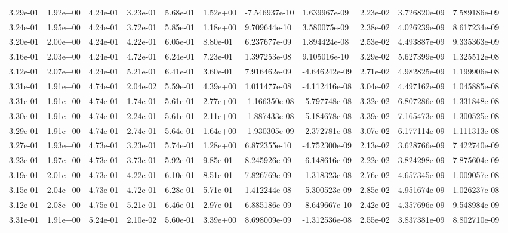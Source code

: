 \begin{longtable}{| p{} | p{} |}
3.29e-01 & 1.92e+00 & 4.24e-01 & 3.23e-01 & 5.68e-01 & 1.52e+00 & -7.546937e-10 &  1.639967e-09 &  2.23e-02 &  3.726820e-09 &  7.589186e-09 \\
3.24e-01 & 1.95e+00 & 4.24e-01 & 3.72e-01 & 5.85e-01 & 1.18e+00 &  9.709644e-10 &  3.580075e-09 &  2.38e-02 &  4.026239e-09 &  8.617234e-09 \\
3.20e-01 & 2.00e+00 & 4.24e-01 & 4.22e-01 & 6.05e-01 & 8.80e-01 &  6.237677e-09 &  1.894424e-08 &  2.53e-02 &  4.493887e-09 &  9.335363e-09 \\
3.16e-01 & 2.03e+00 & 4.24e-01 & 4.72e-01 & 6.24e-01 & 7.23e-01 &  1.397253e-08 &  9.105016e-10 &  3.29e-02 &  5.627399e-09 &  1.325512e-08 \\
3.12e-01 & 2.07e+00 & 4.24e-01 & 5.21e-01 & 6.41e-01 & 3.60e-01 &  7.916462e-09 & -4.646242e-09 &  2.71e-02 &  4.982825e-09 &  1.199906e-08 \\
3.31e-01 & 1.91e+00 & 4.74e-01 & 2.04e-02 & 5.59e-01 & 4.39e+00 &  1.011477e-08 & -4.112416e-08 &  3.04e-02 &  4.497162e-09 &  1.045885e-08 \\
3.31e-01 & 1.91e+00 & 4.74e-01 & 1.74e-01 & 5.61e-01 & 2.77e+00 & -1.166350e-08 & -5.797748e-08 &  3.32e-02 &  6.807286e-09 &  1.331848e-08 \\
3.30e-01 & 1.91e+00 & 4.74e-01 & 2.24e-01 & 5.61e-01 & 2.11e+00 & -1.887433e-08 & -5.184678e-08 &  3.39e-02 &  7.165473e-09 &  1.300525e-08 \\
3.29e-01 & 1.91e+00 & 4.74e-01 & 2.74e-01 & 5.64e-01 & 1.64e+00 & -1.930305e-09 & -2.372781e-08 &  3.07e-02 &  6.177114e-09 &  1.111313e-08 \\
3.27e-01 & 1.93e+00 & 4.73e-01 & 3.23e-01 & 5.74e-01 & 1.28e+00 &  6.872355e-10 & -4.752300e-09 &  2.13e-02 &  3.628766e-09 &  7.422740e-09 \\
3.23e-01 & 1.97e+00 & 4.73e-01 & 3.73e-01 & 5.92e-01 & 9.85e-01 &  8.245926e-09 & -6.148616e-09 &  2.22e-02 &  3.824298e-09 &  7.875604e-09 \\
3.19e-01 & 2.01e+00 & 4.73e-01 & 4.22e-01 & 6.10e-01 & 8.51e-01 &  7.826769e-09 & -1.318323e-08 &  2.76e-02 &  4.657345e-09 &  1.009057e-08 \\
3.15e-01 & 2.04e+00 & 4.73e-01 & 4.72e-01 & 6.28e-01 & 5.71e-01 &  1.412244e-08 & -5.300523e-09 &  2.85e-02 &  4.951674e-09 &  1.026237e-08 \\
3.12e-01 & 2.08e+00 & 4.75e-01 & 5.21e-01 & 6.46e-01 & 2.97e-01 &  6.885186e-09 & -8.649667e-10 &  2.42e-02 &  4.357696e-09 &  9.548984e-09 \\
3.31e-01 & 1.91e+00 & 5.24e-01 & 2.10e-02 & 5.60e-01 & 3.39e+00 &  8.698009e-09 & -1.312536e-08 &  2.55e-02 &  3.837381e-09 &  8.802710e-09 \\

\end{longtable}
